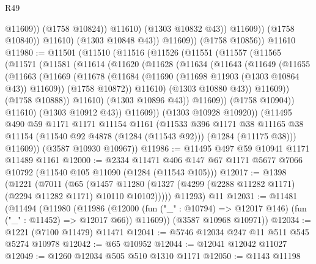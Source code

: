 \begin{lexlean}{R49}
\begin{coremodule}
                              @11609))
                          (@1758 @10824))
                        @11610)
                      (@1303 @10832 @43))
                    @11609))
                (@1758 @10840))
              @11610)
            (@1303 @10848 @43))
          @11609))
      (@1758 @10856))
    @11610
@11980 := @11501
    (@11510
      (@11516
        (@11526
          (@11551
            (@11557
              (@11565
                (@11571
                  (@11581
                    (@11614
                      (@11620
                        (@11628
                          (@11634
                            (@11643
                              (@11649
                                (@11655
                                  (@11663
                                    (@11669
                                      (@11678
                                        (@11684 (@11690 (@11698 @11903 (@1303 @10864 @43)) @11609))
                                        (@1758 @10872))
                                      @11610)
                                    (@1303 @10880 @43))
                                  @11609))
                              (@1758 @10888))
                            @11610)
                          (@1303 @10896 @43))
                        @11609))
                    (@1758 @10904))
                  @11610)
                (@1303 @10912 @43))
              @11609))
          (@1303 @10928 @10920))
        (@11495
          @490
          @59
          @1171
          @1171
          @11154
          @1161
          (@11533
            @396
            @1171
            @38
            @11165
            @38
            @11154
            (@11540 @92 @4878 (@1284 (@11543 @92)))
            (@1284 (@11175 @38)))
          @11609))
      (@3587 @10930 @10967))
@11986 := @11495 @497 @59 @10941 @1171 @11489 @1161
@12000 := @2334
    @11471
    @406
    @147
    @67
    @1171
    @5677
    @7066
    @10792
    (@11540 @105 @11090 (@1284 (@11543 @105)))
@12017 := @1398
    (@1221
      (@7011
        (@65
          (@1457 @11280 (@1327 (@4299 (@2288 @11282 @1171) (@2294 @11282 @1171) @10110 @10102)))))
      @11293)
    @11
@12031 := @11481
    (@11494
      (@11980
        (@11986
          (@12000 (fun ("_" : @10794) => @12017 @146) (fun ("_" : @11452) => @12017 @66))
          @11609))
      (@3587 @10968 @10971))
@12034 := @1221 (@7100 @11479) @11471
@12041 := @5746 @12034 @247 @11 @511 @545 @5274 @10978
@12042 := @65 @10952
@12044 := @12041 @12042 @11027
@12049 := @1260 @12034 @505 @510 @1310 @1171
@12050 := @1143 @11198

\end{coremodule}
\end{lexlean}
